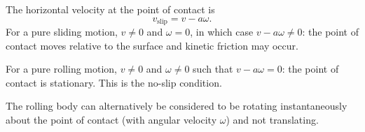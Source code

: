 \documentclass[a4paper]{article}
\begin{document}
The horizontal velocity at the point of contact is
\[
  v_{\text{slip}} = v - a\omega.
\]
For a pure sliding motion, $v \not = 0$ and $\omega = 0$, in which case $v - a\omega \not = 0$: the point of contact moves relative to the surface and kinetic friction may occur.

For a pure rolling motion, $v\not = 0$ and $\omega \not = 0$ such that $v - a\omega = 0$: the point of contact is stationary. This is the no-slip condition.

The rolling body can alternatively be considered to be rotating instantaneously about the point of contact (with angular velocity $\omega$) and not translating.

\begin{eg}\leavevmode
  \begin{center}
  \end{center}


\end{eg}
\end{document}
